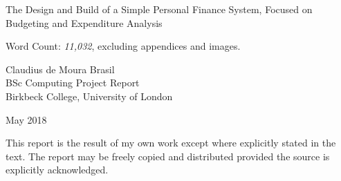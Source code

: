 \begin{titlepage}
  \center
  
  \vspace*{3cm}

  {
    \begin{spacing}{1.2}
      \LARGE The Design and Build of a Simple Personal Finance System, Focused
      on Budgeting and Expenditure Analysis
    \end{spacing}
  }

  \vfill
  
  Word Count: \emph{11,032}, excluding appendices and images.
  
  \vfill

  Claudius de Moura Brasil\\
  BSc Computing Project Report\\
  Birkbeck College, University of London

  May 2018

  This report is the result of my own work except where explicitly stated in
  the text. The report may be freely copied and distributed provided the source
  is explicitly acknowledged.
  
  \vfill

\end{titlepage}

